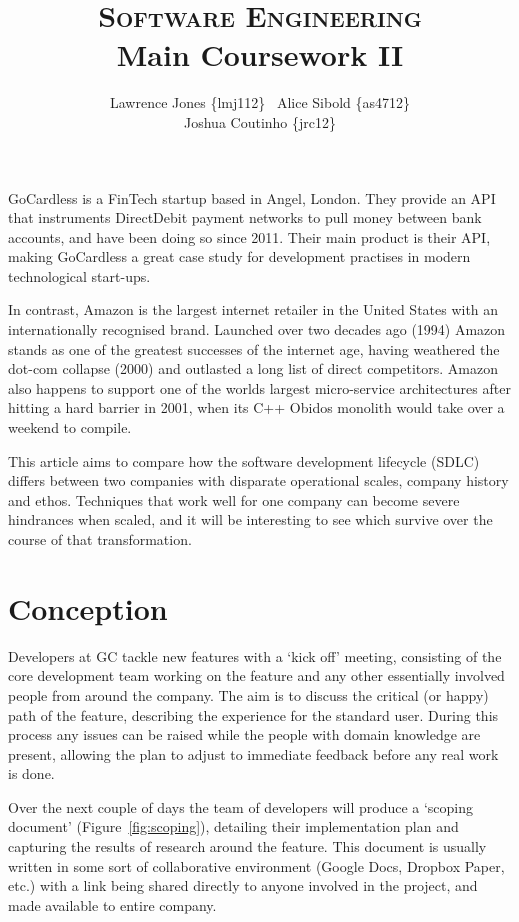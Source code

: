 \documentclass[11pt]{article}
\title{\textsc{Software Engineering}\\Main Coursework II}
\author{Lawrence Jones \{lmj112\} \  Alice Sibold \{as4712\} \\
        Joshua Coutinho \{jrc12\}}
\date{}
\begin{document}
\maketitle


GoCardless is a FinTech startup based in Angel, London. They provide an API that
instruments DirectDebit payment networks to pull money between bank accounts,
and have been doing so since 2011. Their main product is their API, making
GoCardless a great case study for development practises in modern technological
start-ups.

In contrast, Amazon is the largest internet retailer in the United States with
an internationally recognised brand. Launched over two decades ago (1994) Amazon
stands as one of the greatest successes of the internet age, having weathered
the dot-com collapse (2000) and outlasted a long list of direct competitors.
Amazon also happens to support one of the worlds largest micro-service
architectures after hitting a hard barrier in 2001, when its C++ Obidos monolith
would take over a weekend to compile.

This article aims to compare how the software development lifecycle (SDLC)
differs between two companies with disparate operational scales, company history
and ethos. Techniques that work well for one company can become severe
hindrances when scaled, and it will be interesting to see which survive over
the course of that transformation.

\section{Conception}

Developers at GC tackle new features with a `kick off' meeting, consisting of
the core development team working on the feature and any other essentially
involved people from around the company. The aim is to discuss the critical (or
happy) path of the feature, describing the experience for the standard user.
During this process any issues can be raised while the people with domain
knowledge are present, allowing the plan to adjust to immediate feedback before
any real work is done.

Over the next couple of days the team of developers will produce a `scoping
document' (Figure~\ref{fig:scoping}), detailing their implementation plan
and capturing the results of research around the feature. This document is
usually written in some sort of collaborative environment (Google Docs, Dropbox
Paper, etc.) with a link being shared directly to anyone involved in the
project, and made available to entire company.
\end{document}
